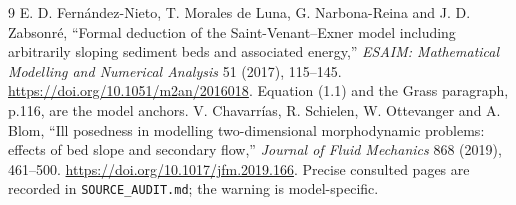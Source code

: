 \documentclass[11pt]{article}
\begin{document}
\begin{thebibliography}{9}
E. D. Fern\'andez-Nieto, T. Morales de Luna, G. Narbona-Reina and
J. D. Zabsonr\'e, ``Formal deduction of the Saint-Venant--Exner model
including arbitrarily sloping sediment beds and associated energy,''
\emph{ESAIM: Mathematical Modelling and Numerical Analysis} 51 (2017),
115--145. \url{https://doi.org/10.1051/m2an/2016018}.
Equation (1.1) and the Grass paragraph, p.116, are the model anchors.
V. Chavarr\'ias, R. Schielen, W. Ottevanger and A. Blom,
``Ill posedness in modelling two-dimensional morphodynamic problems:
effects of bed slope and secondary flow,'' \emph{Journal of Fluid Mechanics}
868 (2019), 461--500. \url{https://doi.org/10.1017/jfm.2019.166}.
Precise consulted pages are recorded in \texttt{SOURCE\_AUDIT.md}; the
warning is model-specific.
\end{thebibliography}
\end{document}
